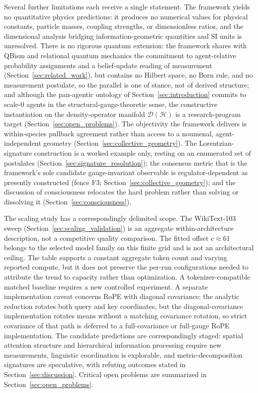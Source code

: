 \documentclass[11pt]{article}
\begin{document}
Several further limitations each receive a single statement. The framework yields no quantitative physics predictions: it produces no numerical values for physical constants, particle masses, coupling strengths, or dimensionless ratios, and the dimensional analysis bridging information-geometric quantities and SI units is unresolved. There is no rigorous quantum extension: the framework shares with QBism and relational quantum mechanics the commitment to agent-relative probability assignments and a belief-update reading of measurement (Section~\ref{sec:related_work}), but contains no Hilbert space, no Born rule, and no measurement postulate, so the parallel is one of stance, not of derived structure; and although the pan-agentic ontology of Section~\ref{sec:introduction} commits to scale-0 agents in the structural-gauge-theoretic sense, the constructive instantiation on the density-operator manifold $\mathcal{D}(\mathcal{H})$ is a research-program target (Section~\ref{sec:open_problems}). The objectivity the framework delivers is within-species pullback agreement rather than access to a noumenal, agent-independent geometry (Section~\ref{sec:collective_geometry}). The Lorentzian-signature construction is a worked example only, resting on an enumerated set of postulates (Section~\ref{sec:signature_resolution}); the consensus metric that is the framework's sole candidate gauge-invariant observable is regulator-dependent as presently constructed (fence F3; Section~\ref{sec:collective_geometry}); and the discussion of consciousness relocates the hard problem rather than solving or dissolving it (Section~\ref{sec:consciousness}).

The scaling study has a correspondingly delimited scope. The WikiText-103 sweep (Section~\ref{sec:scaling_validation}) is an aggregate within-architecture description, not a competitive quality comparison. The fitted offset $c\approx61$ belongs to the selected model family on this finite grid and is not an architectural ceiling. The table supports a constant aggregate token count and varying reported compute, but it does not preserve the per-run configurations needed to attribute the trend to capacity rather than optimization. A tokenizer-compatible matched baseline requires a new controlled experiment. A separate implementation caveat concerns RoPE with diagonal covariance: the analytic reduction rotates both query and key coordinates, but the diagonal-covariance implementation rotates means without a matching covariance rotation, so strict covariance of that path is deferred to a full-covariance or full-gauge RoPE implementation. The candidate predictions are correspondingly staged: spatial attention structure and hierarchical information processing require new measurements, linguistic coordination is explorable, and metric-decomposition signatures are speculative, with refuting outcomes stated in Section~\ref{sec:discussion}. Critical open problems are summarized in Section~\ref{sec:open_problems}.
\end{document}
